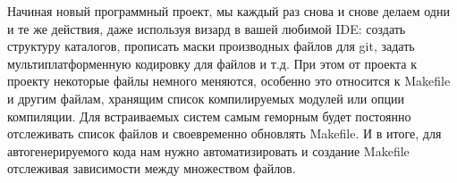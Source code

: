 \clearpage
{}\label{circfiles}


Начиная новый программный проект, мы каждый раз снова и снове делаем одни и те
же действия, даже используя визард в вашей любимой IDE: создать структуру
каталогов, прописать маски производных файлов для git, задать
мультиплатформенную кодировку для файлов и т.д. При этом от проекта к проекту
некоторые файлы немного меняются, особенно это относится к Makefile и другим
файлам, хранящим список компилируемых модулей или опции компиляции.
Для встраиваемых систем самым геморным будет постоянно отслеживать список файлов
и своевременно обновлять Makefile. И в итоге, для
автогенерируемого кода нам нужно автоматизировать и создание Makefile отслеживая
зависимости между множеством файлов.

